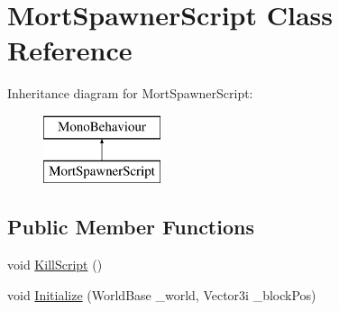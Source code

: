\hypertarget{class_mort_spawner_script}{}\section{Mort\+Spawner\+Script Class Reference}
\label{class_mort_spawner_script}
Inheritance diagram for Mort\+Spawner\+Script\+:\begin{figure}[H]
\begin{center}
\leavevmode
\includegraphics[height=2.000000cm]{dd/d50/class_mort_spawner_script}
\end{center}
\end{figure}
\subsection*{Public Member Functions}
\begin{DoxyCompactItemize}
\item 
void \mbox{\hyperlink{class_mort_spawner_script_abbdcbd5b022cdc08814b203cef65dfa1}{Kill\+Script}} ()
\item 
void \mbox{\hyperlink{class_mort_spawner_script_a6b9fd10724d483ddf05dc342cad37891}{Initialize}} (World\+Base \+\_\+world, Vector3i \+\_\+block\+Pos)
\end{DoxyCompactItemize}
